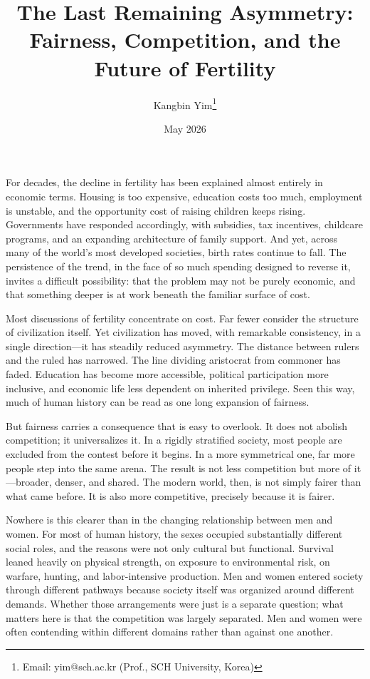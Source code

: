 \documentclass[12pt]{article}
\title{The Last Remaining Asymmetry:\\Fairness, Competition, and the Future of Fertility}
\author{Kangbin Yim\thanks{Email: yim@sch.ac.kr (Prof., SCH University, Korea)}}
\date{May 2026}
\begin{document}
\maketitle

For decades, the decline in fertility has been explained almost entirely in economic terms. Housing is too expensive, education costs too much, employment is unstable, and the opportunity cost of raising children keeps rising. Governments have responded accordingly, with subsidies, tax incentives, childcare programs, and an expanding architecture of family support. And yet, across many of the world's most developed societies, birth rates continue to fall. The persistence of the trend, in the face of so much spending designed to reverse it, invites a difficult possibility: that the problem may not be purely economic, and that something deeper is at work beneath the familiar surface of cost.

Most discussions of fertility concentrate on cost. Far fewer consider the structure of civilization itself. Yet civilization has moved, with remarkable consistency, in a single direction—it has steadily reduced asymmetry. The distance between rulers and the ruled has narrowed. The line dividing aristocrat from commoner has faded. Education has become more accessible, political participation more inclusive, and economic life less dependent on inherited privilege. Seen this way, much of human history can be read as one long expansion of fairness.

But fairness carries a consequence that is easy to overlook. It does not abolish competition; it universalizes it. In a rigidly stratified society, most people are excluded from the contest before it begins. In a more symmetrical one, far more people step into the same arena. The result is not less competition but more of it—broader, denser, and shared. The modern world, then, is not simply fairer than what came before. It is also more competitive, precisely because it is fairer.

Nowhere is this clearer than in the changing relationship between men and women. For most of human history, the sexes occupied substantially different social roles, and the reasons were not only cultural but functional. Survival leaned heavily on physical strength, on exposure to environmental risk, on warfare, hunting, and labor-intensive production. Men and women entered society through different pathways because society itself was organized around different demands. Whether those arrangements were just is a separate question; what matters here is that the competition was largely separated. Men and women were often contending within different domains rather than against one another.
\end{document}
